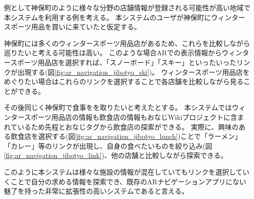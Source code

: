 例として神保町のように様々な分野の店舗情報が登録される可能性が高い地域で本システムを利用する例を考える。
本システムのユーザが神保町にウィンタースポーツ用品を買いに来ていたと仮定する。

神保町には多くのウィンタースポーツ用品店があるため、これらを比較しながら巡りたいと考える可能性は高い。
このような場合ARでの表示情報からウィンタースポーツ用品店を選択すれば、「スノーボード」「スキー」といったいったリンクが出現する(図\ref{fig:ar_navigation_jibotyo_ski})。
ウィンタースポーツ用品店をめぐりたい場合はこれらのリンクを選択することで各店舗を比較しながら見ることができる。

その後同じく神保町で食事をを取りたいと考えたとする。
本システムではウィンタースポーツ用品店の情報も飲食店の情報もおなじWikiプロジェクトに含まれているため先程とおなじタグから飲食店の探索ができる。
実際に、興味のある飲食店を選択する(図\ref{fig:ar_navigation_jibotyo_lunch})ことで「ラーメン」「カレー」等のリンクが出現し、自身の食べたいものを絞り込み(図\ref{fig:ar_navigation_jibotyo_link})、他の店舗と比較しながら探索できる。

このように本システムは様々な施設の情報が混在していてもリンクを選択していくことで自分の求める情報を探索でき、既存のARナビゲーションアプリにない魅了を持った非常に拡張性の高いシステムであると言える。


